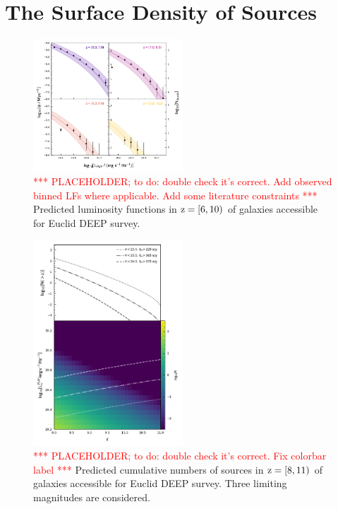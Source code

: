 
\section{The Surface Density of Sources}


\begin{figure}
	\centering
	\includegraphics[width=0.5\textwidth]{figures/density/LF.pdf}
	\caption{\textcolor{red}{*** PLACEHOLDER; to do: double check it's correct. Add observed binned LFs where applicable. Add some literature constraints ***}{ Predicted luminosity functions in $\rm z = [6, 10)$ of galaxies accessible for Euclid DEEP survey.} 
	\label{fig:density:lfs}}
\end{figure}


\begin{figure}
	\centering
	\includegraphics[width=0.5\textwidth]{figures/density/density.pdf}
	\caption{\textcolor{red}{*** PLACEHOLDER; to do: double check it's correct. Fix colorbar label *** }{Predicted cumulative numbers of sources in $\rm z = [8, 11)$ of galaxies accessible for Euclid DEEP survey. Three limiting magnitudes are considered.} 
	\label{fig:density:lfs}}
\end{figure}
